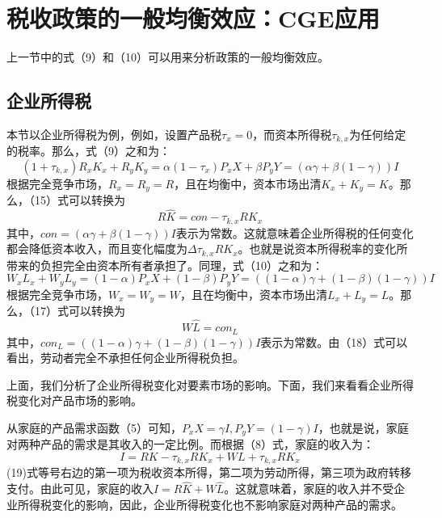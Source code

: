 \documentclass[cn,12pt,math=newtx,citestyle=gb7714-2015,bibstyle=gb7714-2015]{elegantbook}
\begin{document}
	
	\section{税收政策的一般均衡效应：CGE应用}
	上一节中的式（9）和（10）可以用来分析政策的一般均衡效应。
	\subsection{企业所得税}
	本节以企业所得税为例，例如，设置产品税$\tau_x=0$，而资本所得税$\tau_{k,x}$为任何给定的税率。那么，式（9）之和为：
	\begin{equation}
		(1+\tau_{k,x})R_xK_x+R_yK_y=\alpha(1-\tau_x)P_xX+\beta P_yY=(\alpha \gamma +\beta (1-\gamma)) I
	\end{equation}
	根据完全竞争市场，$R_x=R_y=R$，且在均衡中，资本市场出清$K_x+K_y=K$。那么，（15）式可以转换为
	\begin{equation}
		R\hat{K}=con-\tau_{k,x}RK_x
	\end{equation}
	其中，$con=(\alpha \gamma +\beta (1-\gamma)) I$表示为常数。这就意味着企业所得税的任何变化都会降低资本收入，而且变化幅度为$\Delta\tau_{k,x}RK_x$。也就是说资本所得税率的变化所带来的负担完全由资本所有者承担了。同理，式（10）之和为：
	\begin{equation}
		W_xL_x+W_yL_y=(1-\alpha)P_xX+(1-\beta) P_yY=((1-\alpha)\gamma +(1-\beta)(1-\gamma)) I
	\end{equation}
	根据完全竞争市场，$W_x=W_y=W$，且在均衡中，资本市场出清$L_x+L_y=L$。那么，（17）式可以转换为
	\begin{equation}
		W\hat{L}=con_L
	\end{equation}
	其中，$con_L=((1-\alpha)\gamma +(1-\beta)(1-\gamma)) I$表示为常数。由（18）式可以看出，劳动者完全不承担任何企业所得税负担。
	
	上面，我们分析了企业所得税变化对要素市场的影响。下面，我们来看看企业所得税变化对产品市场的影响。
	
	从家庭的产品需求函数（5）可知，$P_xX=\gamma I,P_yY=(1-\gamma)I$，也就是说，家庭对两种产品的需求是其收入的一定比例。而根据（8）式，家庭的收入为：
	\begin{equation}
		I=RK-\tau_{k,x}RK_x+WL+\tau_{k,x}RK_x
	\end{equation}
	(19)式等号右边的第一项为税收资本所得，第二项为劳动所得，第三项为政府转移支付。由此可见，家庭的收入$I=R\hat{K}+W\hat{L}$。这就意味着，家庭的收入并不受企业所得税变化的影响，因此，企业所得税变化也不影响家庭对两种产品的需求。
	
\end{document}
